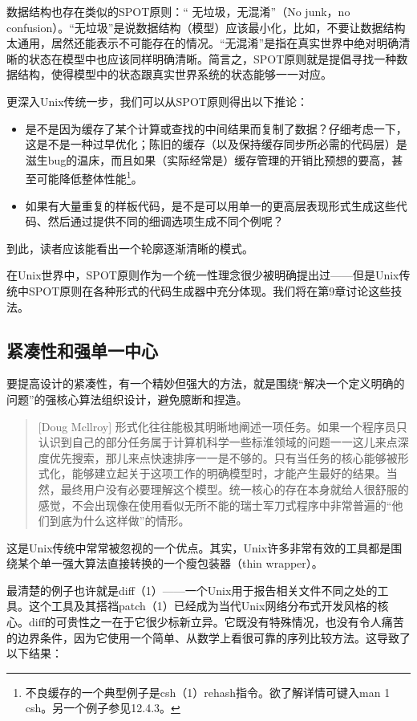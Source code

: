 \documentclass[11pt,oneside]{book}
\begin{document}
\begin{common-format}
数据结构也存在类似的SPOT原则：“ 无垃圾，无混淆”（No junk，no confusion）。“无垃圾”是说数据结构（模型）应该最小化，比如，不要让数据结构太通用，居然还能表示不可能存在的情况。“无混淆”是指在真实世界中绝对明确清晰的状态在模型中也应该同样明确清晰。简言之，SPOT原则就是提倡寻找一种数据结构，使得模型中的状态跟真实世界系统的状态能够一一对应。

更深入Unix传统一步，我们可以从SPOT原则得出以下推论：

\begin{itemize}
\item 是不是因为缓存了某个计算或查找的中间结果而复制了数据？仔细考虑一下，这是不是一种过早优化；陈旧的缓存（以及保持缓存同步所必需的代码层）是滋生bug的温床，而且如果（实际经常是）缓存管理的开销比预想的要高，甚至可能降低整体性能\footnote{不良缓存的一个典型例子是csh（1）rehash指令。欲了解详情可键入man 1 csh。另一个例子参见12.4.3。}。
\item 如果有大量重复的样板代码，是不是可以用单一的更高层表现形式生成这些代码、然后通过提供不同的细调选项生成不同个例呢？
\end{itemize}

到此，读者应该能看出一个轮廓逐渐清晰的模式。

在Unix世界中，SPOT原则作为一个统一性理念很少被明确提出过——但是Unix传统中SPOT原则在各种形式的代码生成器中充分体现。我们将在第9章讨论这些技法。

\subsection{紧凑性和强单一中心}
要提高设计的紧凑性，有一个精妙但强大的方法，就是围绕“解决一个定义明确的问题”的强核心算法组织设计，避免臆断和捏造。

\begin{quote}[Doug Mcllroy]
形式化往往能极其明晰地阐述一项任务。如果一个程序员只认识到自己的部分任务属于计算机科学一些标淮领域的问题一一这儿来点深度优先搜索，那儿来点快速排序一一是不够的。只有当任务的核心能够被形式化，能够建立起关于这项工作的明确模型时，才能产生最好的结果。当然，最终用户没有必要理解这个模型。统一核心的存在本身就给人很舒服的感觉，不会出现像在使用看似无所不能的瑞士军刀式程序中非常普遍的“他们到底为什么这样做”的情形。
\end{quote}

这是Unix传统中常常被忽视的一个优点。其实，Unix许多非常有效的工具都是围绕某个单一强大算法直接转换的一个瘦包装器（thin wrapper）。

最清楚的例子也许就是diff（1）——一个Unix用于报告相关文件不同之处的工具。这个工具及其搭裆patch（1）已经成为当代Unix网络分布式开发风格的核心。diff的可贵性之一在于它很少标新立异。它既没有特殊情况，也没有令人痛苦的边界条件，因为它使用一个简单、从数学上看很可靠的序列比较方法。这导致了以下结果：


\end{common-format}
\end{document}
